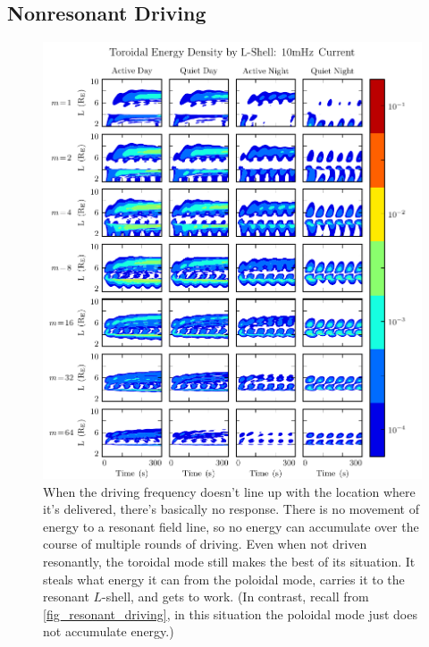 \subsection{Nonresonant Driving}


\begin{figure}[H]
    \centering
    \includegraphics[width=\textwidth]{figures/ucolor_tor_010mHz.pdf}
    \caption[Poloidal and Toroidal Energy Distribution: Resonant Driving]{
      When the driving frequency doesn't line up with the location where it's delivered, there's basically no response. There is no movement of energy to a resonant field line, so no energy can accumulate over the course of multiple rounds of driving. Even when not driven resonantly, the toroidal mode still makes the best of its situation. It steals what energy it can from the poloidal mode, carries it to the resonant $L$-shell, and gets to work. (In contrast, recall from \cref{fig_resonant_driving}, in this situation the poloidal mode just does not accumulate energy.)
    }
    \label{fig_nonresonant_driving}
\end{figure}

